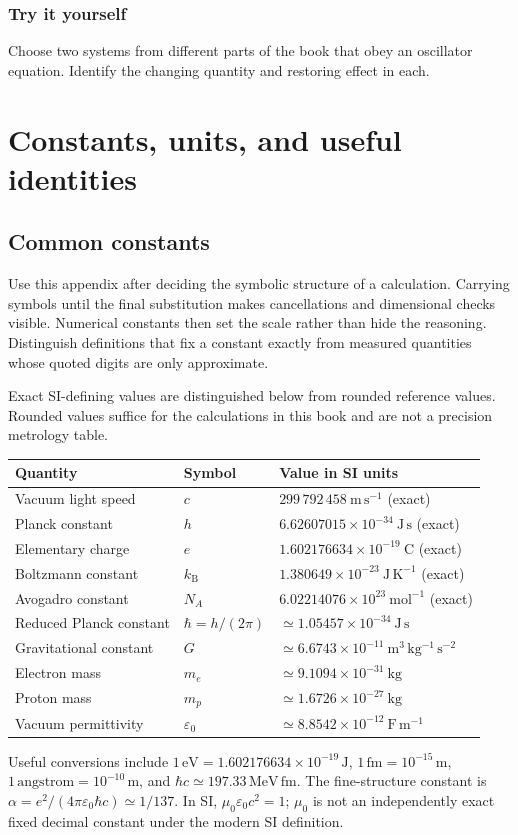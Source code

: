\documentclass[11pt,oneside]{book}
\newcommand{\kb}{k_{\mathrm B}}
\newcommand{\eps}{\varepsilon_0}
\newcommand{\mun}{\mu_0}
\theoremstyle{reviewstyle}
\newcommand{\learningcheck}[1]{\subsection*{Try it yourself}\noindent #1\par}
\begin{document}
\appendix
\learningcheck{Choose two systems from different parts of the book that obey an oscillator equation. Identify the changing quantity and restoring effect in each.}

\chapter{Constants, units, and useful identities}
\section{Common constants}
Use this appendix after deciding the symbolic structure of a calculation. Carrying symbols until the final substitution makes cancellations and dimensional checks visible. Numerical constants then set the scale rather than hide the reasoning. Distinguish definitions that fix a constant exactly from measured quantities whose quoted digits are only approximate.

Exact SI-defining values are distinguished below from rounded reference values. Rounded values suffice for the calculations in this book and are not a precision metrology table.
\begin{center}
\begin{tabular}{lll}
\toprule
Quantity & Symbol & Value in SI units\\
\midrule
Vacuum light speed & $c$ & $299\,792\,458\ \mathrm{m\,s^{-1}}$ (exact)\\
Planck constant & $h$ & $6.62607015\times10^{-34}\ \mathrm{J\,s}$ (exact)\\
Elementary charge & $e$ & $1.602176634\times10^{-19}\ \mathrm C$ (exact)\\
Boltzmann constant & $\kb$ & $1.380649\times10^{-23}\ \mathrm{J\,K^{-1}}$ (exact)\\
Avogadro constant & $N_A$ & $6.02214076\times10^{23}\ \mathrm{mol^{-1}}$ (exact)\\
Reduced Planck constant & $\hbar=h/(2\pi)$ & $\simeq1.05457\times10^{-34}\ \mathrm{J\,s}$\\
Gravitational constant & $G$ & $\simeq6.6743\times10^{-11}\ \mathrm{m^3\,kg^{-1}\,s^{-2}}$\\
Electron mass & $m_e$ & $\simeq9.1094\times10^{-31}\ \mathrm{kg}$\\
Proton mass & $m_p$ & $\simeq1.6726\times10^{-27}\ \mathrm{kg}$\\
Vacuum permittivity & $\eps$ & $\simeq8.8542\times10^{-12}\ \mathrm{F\,m^{-1}}$\\
\bottomrule
\end{tabular}
\end{center}
Useful conversions include $1\,\mathrm{eV}=1.602176634\times10^{-19}\,\mathrm J$, $1\,\mathrm{fm}=10^{-15}\,\mathrm m$, $1\,\text{angstrom}=10^{-10}\,\mathrm m$, and $\hbar c\simeq197.33\,\mathrm{MeV\,fm}$. The fine-structure constant is $\alpha=e^2/(4\pi\eps\hbar c)\simeq1/137$. In SI, $\mun\eps c^2=1$; $\mun$ is not an independently exact fixed decimal constant under the modern SI definition.
\end{document}
